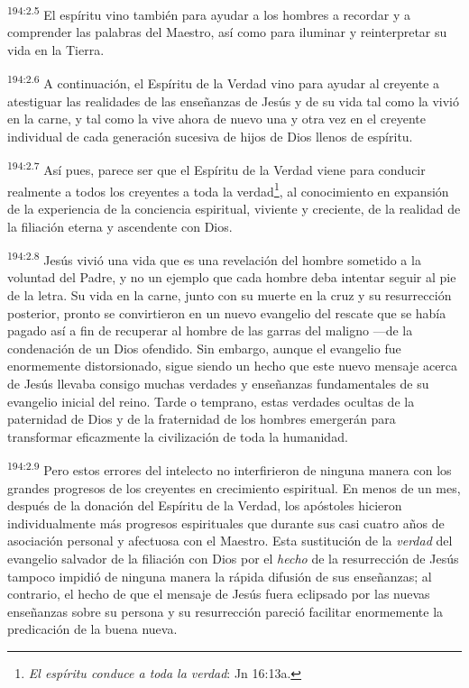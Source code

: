 \par 
\textsuperscript{194:2.5} El espíritu vino también para ayudar a los hombres a recordar y a comprender las palabras del Maestro, así como para iluminar y reinterpretar su vida en la Tierra.

\par 
\textsuperscript{194:2.6} A continuación, el Espíritu de la Verdad vino para ayudar al creyente a atestiguar las realidades de las enseñanzas de Jesús y de su vida tal como la vivió en la carne, y tal como la vive ahora de nuevo una y otra vez en el creyente individual de cada generación sucesiva de hijos de Dios llenos de espíritu.

\par 
\textsuperscript{194:2.7} Así pues, parece ser que el Espíritu de la Verdad viene para conducir realmente a todos los creyentes a toda la verdad\footnote{\textit{El espíritu conduce a toda la verdad}: Jn 16:13a.}, al conocimiento en expansión de la experiencia de la conciencia espiritual, viviente y creciente, de la realidad de la filiación eterna y ascendente con Dios.

\par 
\textsuperscript{194:2.8} Jesús vivió una vida que es una revelación del hombre sometido a la voluntad del Padre, y no un ejemplo que cada hombre deba intentar seguir al pie de la letra. Su vida en la carne, junto con su muerte en la cruz y su resurrección posterior, pronto se convirtieron en un nuevo evangelio del rescate que se había pagado así a fin de recuperar al hombre de las garras del maligno ---de la condenación de un Dios ofendido. Sin embargo, aunque el evangelio fue enormemente distorsionado, sigue siendo un hecho que este nuevo mensaje acerca de Jesús llevaba consigo muchas verdades y enseñanzas fundamentales de su evangelio inicial del reino. Tarde o temprano, estas verdades ocultas de la paternidad de Dios y de la fraternidad de los hombres emergerán para transformar eficazmente la civilización de toda la humanidad.

\par 
\textsuperscript{194:2.9} Pero estos errores del intelecto no interfirieron de ninguna manera con los grandes progresos de los creyentes en crecimiento espiritual. En menos de un mes, después de la donación del Espíritu de la Verdad, los apóstoles hicieron individualmente más progresos espirituales que durante sus casi cuatro años de asociación personal y afectuosa con el Maestro. Esta sustitución de la \textit{verdad} del evangelio salvador de la filiación con Dios por el \textit{hecho} de la resurrección de Jesús tampoco impidió de ninguna manera la rápida difusión de sus enseñanzas; al contrario, el hecho de que el mensaje de Jesús fuera eclipsado por las nuevas enseñanzas sobre su persona y su resurrección pareció facilitar enormemente la predicación de la buena nueva.

